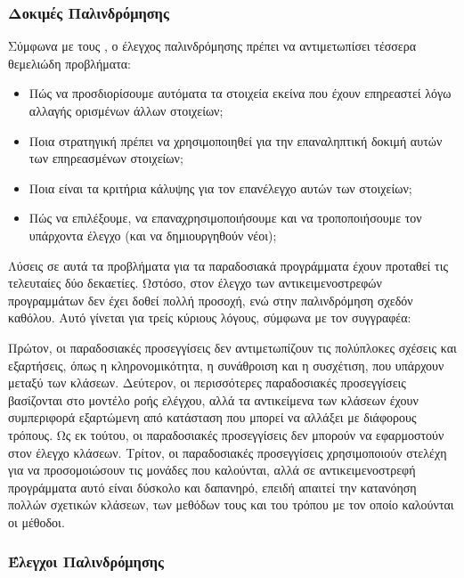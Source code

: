 \documentclass[12pt]{article}
\begin{document}
\subsubsection{Δοκιμές Παλινδρόμησης}
\label{sec:Regression}

Σύμφωνα με τους \textcite{kung}, ο έλεγχος παλινδρόμησης πρέπει να αντιμετωπίσει τέσσερα θεμελιώδη προβλήματα:

\begin{itemize}
\item Πώς να προσδιορίσουμε αυτόματα τα στοιχεία εκείνα που έχουν επηρεαστεί λόγω αλλαγής ορισμένων άλλων στοιχείων;
\item Ποια στρατηγική πρέπει να χρησιμοποιηθεί για την επαναληπτική δοκιμή αυτών των επηρεασμένων στοιχείων;
\item Ποια είναι τα κριτήρια κάλυψης για τον επανέλεγχο αυτών των στοιχείων;
\item Πώς να επιλέξουμε, να επαναχρησιμοποιήσουμε και να τροποποιήσουμε τον υπάρχοντα έλεγχο (και να δημιουργηθούν νέοι);
\end{itemize} 

\par Λύσεις σε αυτά τα προβλήματα για τα παραδοσιακά προγράμματα έχουν προταθεί τις τελευταίες δύο δεκαετίες. Ωστόσο, στον έλεγχο των αντικειμενοστρεφών προγραμμάτων δεν έχει δοθεί πολλή προσοχή, ενώ στην παλινδρόμηση σχεδόν καθόλου. Αυτό γίνεται για τρείς κύριους λόγους, σύμφωνα με τον συγγραφέα:

\par Πρώτον, οι παραδοσιακές προσεγγίσεις δεν αντιμετωπίζουν τις πολύπλοκες σχέσεις και εξαρτήσεις, όπως η κληρονομικότητα, η συνάθροιση και η συσχέτιση, που υπάρχουν μεταξύ των κλάσεων. Δεύτερον, οι περισσότερες παραδοσιακές προσεγγίσεις βασίζονται στο μοντέλο ροής ελέγχου, αλλά τα αντικείμενα των κλάσεων έχουν συμπεριφορά εξαρτώμενη από κατάσταση που μπορεί να αλλάξει με διάφορους τρόπους. Ως εκ τούτου, οι παραδοσιακές προσεγγίσεις δεν μπορούν να εφαρμοστούν στον έλεγχο κλάσεων. Τρίτον, οι παραδοσιακές προσεγγίσεις χρησιμοποιούν στελέχη για να προσομοιώσουν τις μονάδες που καλούνται, αλλά σε αντικειμενοστρεφή προγράμματα αυτό είναι δύσκολο και δαπανηρό, επειδή απαιτεί την κατανόηση πολλών σχετικών κλάσεων, των μεθόδων τους και του τρόπου με τον οποίο καλούνται οι μέθοδοι.

\subsubsection{Έλεγχοι Παλινδρόμησης}
\end{document}
